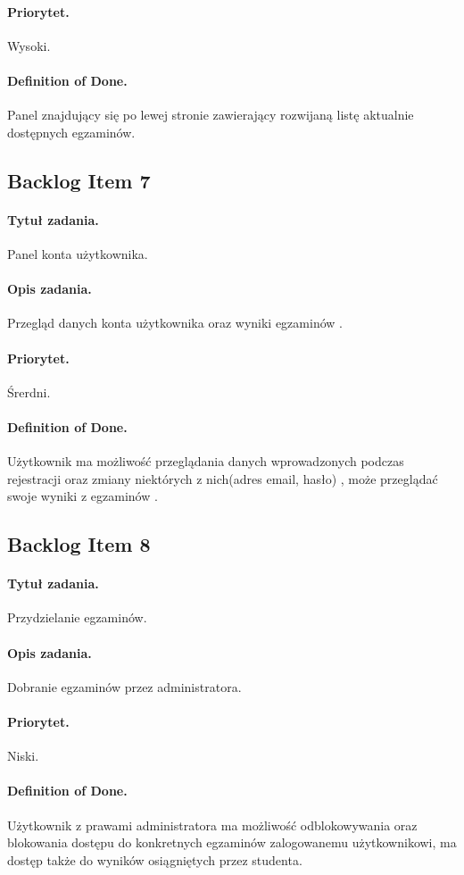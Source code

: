 \documentclass[a4paper]{article}
\begin{document}
\paragraph{Priorytet.} Wysoki.
\paragraph{Definition of Done.} Panel znajdujący się po lewej stronie zawierający rozwijaną listę aktualnie dostępnych egzaminów.

\subsection{Backlog Item 7}
\paragraph{Tytuł zadania.} Panel konta użytkownika.
\paragraph{Opis zadania.} Przegląd danych konta użytkownika oraz wyniki egzaminów .
\paragraph{Priorytet.} Śrerdni.
\paragraph{Definition of Done.} Użytkownik ma możliwość przeglądania danych wprowadzonych podczas rejestracji oraz zmiany niektórych z nich(adres email, hasło) , może przeglądać swoje wyniki z egzaminów .

\subsection{Backlog Item 8}
\paragraph{Tytuł zadania.} Przydzielanie egzaminów.
\paragraph{Opis zadania.} Dobranie egzaminów przez administratora.
\paragraph{Priorytet.} Niski.
\paragraph{Definition of Done.} Użytkownik z prawami administratora ma możliwość odblokowywania oraz blokowania dostępu do konkretnych egzaminów zalogowanemu użytkownikowi, ma dostęp także do wyników osiągniętych przez studenta.
\end{document}
